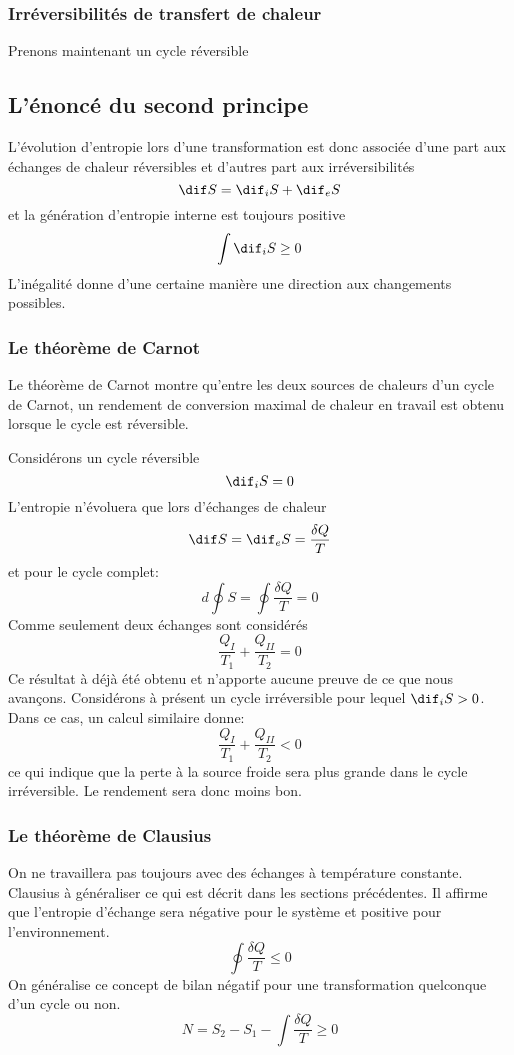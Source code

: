 \subsubsection{Irréversibilités de transfert de chaleur}
Prenons maintenant un cycle réversible

\subsection{L'énoncé du second principe}
L'évolution d'entropie lors d'une transformation est
donc associée d'une part aux échanges de chaleur réversibles et
d'autres part aux irréversibilités
\[ \dif S = \dif_iS+\dif_eS \]
et la génération d'entropie interne est toujours positive
\[ \int \dif_iS \geq 0  \]
L'inégalité donne d'une certaine manière une direction
aux changements possibles.

\subsubsection{Le théorème de Carnot}
Le théorème de Carnot montre qu'entre les deux sources de chaleurs
d'un cycle de Carnot, un rendement de conversion  maximal de chaleur
en travail est obtenu lorsque le cycle est réversible.

Considérons un cycle réversible
\[ \dif_iS = 0 \]
L'entropie n'évoluera que lors d'échanges de chaleur
\[ \dif S = \dif_eS = \frac{\delta Q}T \]
et pour le cycle complet:
\[ d\oint S = \oint \frac {\delta Q}{T} = 0 \]
Comme seulement deux échanges sont considérés
\[ \frac{Q_I}{T_1}+\frac{Q_{II}}{T_2} = 0 \]
Ce résultat à déjà été obtenu et n'apporte aucune preuve
de ce que nous avançons.
Considérons à présent un cycle irréversible pour lequel $\dif_iS > 0$.
Dans ce cas, un calcul similaire donne:
\[ \frac{Q_I}{T_1}+\frac{Q_{II}}{T_2} < 0 \]
ce qui indique que la perte à la source froide sera
plus grande dans le cycle irréversible.
Le rendement sera donc moins bon.

\subsubsection{Le théorème de Clausius}
On ne travaillera pas toujours avec des échanges à température constante.
Clausius à généraliser ce qui est décrit dans les sections précédentes.
Il affirme que l'entropie d'échange sera négative pour le système et
positive pour l'environnement.
\[ \oint \frac{\delta Q}T \leq 0  \]
On généralise ce concept de bilan négatif pour
une transformation quelconque d'un cycle ou non.
\[ N = S_2-S_1-\int \frac{\delta Q}T \geq 0 \]

